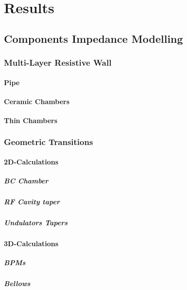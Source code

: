 \chapter{Results}
\section{Components Impedance Modelling}
\subsection{Multi-Layer Resistive Wall}
\subsubsection{Pipe}
\subsubsection{Ceramic Chambers}
\subsubsection{Thin Chambers}
\subsection{Geometric Transitions}
\subsubsection{2D-Calculations}
\paragraph{BC Chamber}
\paragraph{RF Cavity taper}
\paragraph{Undulators Tapers}
\subsubsection{3D-Calculations}
\paragraph{BPMs}
\paragraph{Bellows}
